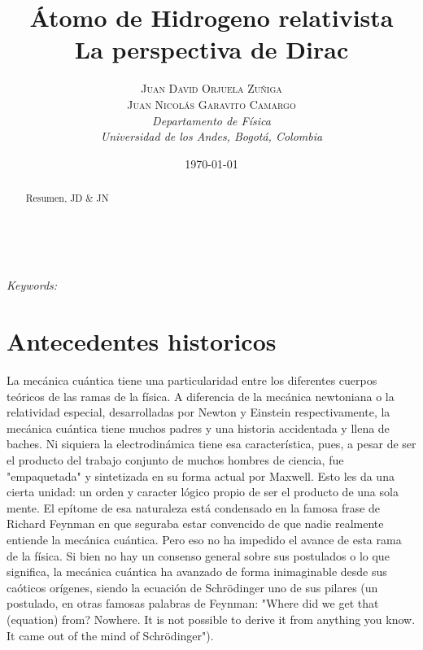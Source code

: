 \documentclass[a4paper, 12pt]{article} %
\title{\textbf{\'Atomo de Hidrogeno relativista}\\ %
La perspectiva de Dirac} %
\author{\textsc{Juan David Orjuela Zu\~niga \\ Juan Nicol\'as Garavito Camargo} %
\\{\textit{Departamento de F\'isica\\}
\textit{Universidad de los Andes, Bogot\'a, Colombia}}} %
\date{\today} %
\makeatletter
\renewcommand{\maketitle}{ %
\begin{flushright} %
{\LARGE\@title} %

\vspace{50pt} %

{\large\@author} %
\\\@date %

\vspace{40pt} %
\end{flushright}
}
\makeatother
\begin{document}
\maketitle %



\begin{abstract}
Resumen, JD \& JN
\end{abstract}
\hspace*{3,6mm}\textit{Keywords:}  %

\vspace{30pt} %


\section{Antecedentes historicos}


La mec\'anica cu\'antica tiene una particularidad entre los diferentes cuerpos te\'oricos de las ramas de la f\'isica. A diferencia de la mec\'anica newtoniana o la relatividad especial, desarrolladas por Newton y Einstein respectivamente, la mec\'anica cu\'antica tiene muchos padres y una historia accidentada y llena de baches. Ni siquiera la electrodin\'amica tiene esa caracter\'istica, pues, a pesar de ser el producto del trabajo conjunto de muchos hombres de ciencia, fue "empaquetada" y sintetizada en su forma actual por Maxwell. Esto les da una cierta unidad: un orden y caracter l\'ogico propio de ser el producto de una sola mente. El ep\'itome de esa naturaleza est\'a condensado en la famosa frase de Richard Feynman en que seguraba estar convencido de que nadie realmente entiende la mec\'anica cu\'antica. Pero eso no ha impedido el avance de esta rama de la f\'isica. Si bien no hay un consenso general sobre sus postulados o lo que significa, la mec\'anica cu\'antica ha avanzado de forma inimaginable desde sus ca\'oticos or\'igenes, siendo la ecuaci\'on de Schr\"odinger uno de sus pilares (un postulado, en otras famosas palabras de Feynman: "Where did we get that (equation) from? Nowhere. It is not possible to derive it from anything you know. It came out of the mind of Schr\"odinger").
\end{document}
